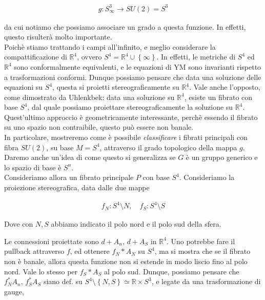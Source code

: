 \documentclass{report}
\begin{document}
\begin{align}
    g: S^3_{\infty} \rightarrow SU(2) = S^3
\end{align}

da cui notiamo che possiamo associare un grado a questa funzione. In effetti, questo risulterà molto importante. \\

Poichè stiamo trattando i campi all'infinito, e meglio considerare la compattificazione di \(\mathbb{R}^4\), ovvero \(S^4 = \mathbb{R}^4 \cup \left\{ \infty \right\}\). In effetti, le metriche di \(S^4\) ed \(\mathbb{R}^4\) sono conformalmente equivalenti, e le equazioni di YM sono invarianti rispetto a trasformazioni conformi. Dunque possiamo pensare che data una soluzione delle equazioni su \(S^4\), questa si proietti stereograficamente su \(\mathbb{R}^4\). Vale anche l'opposto, come dimostrato da Uhlenkbek: data una soluzione su \(\mathbb{R}^4\), esiste un fibrato con base \(S^4\), dal quale possiamo proiettare stereograficamente la soluzione su \(\mathbb{R}^4\). \\

Quest'ultimo approccio è geometricamente interessante, perchè essendo il fibrato su uno spazio non contraibile, questo può essere non banale. \\

In particolare, mostreremo come è possibile \emph{classificare} i fibrati principali con fibra \(SU(2)\), su base \(M = S^4\), attraverso il grado topologico della mappa \(g\). Daremo anche un'idea di come questo si generalizza se \(G\) è un gruppo generico e lo spazio di base è \(S^n\). \\

Consideriamo allora un fibrato principale \(P\) con base \(S^4\). Consideriamo la proiezione stereografica, data dalle due mappe 

\begin{align}
    f_N: S^4 \setminus N, \quad f_S: S^4 \setminus S
\end{align}

Dove con \(N, S\) abbiamo indicato il polo nord e il polo sud della sfera. 

Le connessioni proiettate sono \(d + A_n, \, d + A_S\) in \(\mathbb{R}^4\). Uno potrebbe fare il pullback attraverso \(f\), ed ottenere \(f_N* A_N\) su \(S^4\), ma si mostra che se il fibrato non è banale, allora questa funzione non si estende in modo liscio fino al polo nord. Vale lo stesso per \(f_S*A_S\) al polo sud. Dunque, possiamo pensare che \(f_N^*A_n, \, f_S^*A_S\) siano def. su \(S^4 \setminus \left\{N, S\right\} \simeq \mathbb{R} \times S^3\), e legate da una trasformazione di gauge, 
\end{document}
